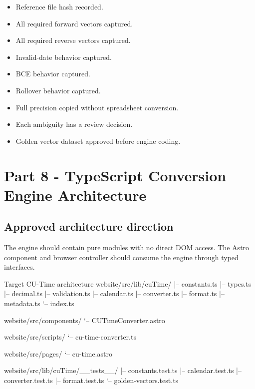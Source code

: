 \documentclass[11pt,letterpaper]{article}
\newcommand{\checkbox}{\(\square\)}
\begin{document}
\begin{itemize}
    \item[\checkbox] Reference file hash recorded.
    \item[\checkbox] All required forward vectors captured.
    \item[\checkbox] All required reverse vectors captured.
    \item[\checkbox] Invalid-date behavior captured.
    \item[\checkbox] BCE behavior captured.
    \item[\checkbox] Rollover behavior captured.
    \item[\checkbox] Full precision copied without spreadsheet conversion.
    \item[\checkbox] Each ambiguity has a review decision.
    \item[\checkbox] Golden vector dataset approved before engine coding.
\end{itemize}

\section{Part 8 - TypeScript Conversion Engine Architecture}

\subsection{Approved architecture direction}

The engine should contain pure modules with no direct DOM access. The Astro
component and browser controller should consume the engine through typed
interfaces.

\begin{codebox}{Target CU-Time architecture}
website/src/lib/cuTime/
|-- constants.ts
|-- types.ts
|-- decimal.ts
|-- validation.ts
|-- calendar.ts
|-- converter.ts
|-- format.ts
|-- metadata.ts
`-- index.ts

website/src/components/
`-- CUTimeConverter.astro

website/src/scripts/
`-- cu-time-converter.ts

website/src/pages/
`-- cu-time.astro

website/src/lib/cuTime/__tests__/
|-- constants.test.ts
|-- calendar.test.ts
|-- converter.test.ts
|-- format.test.ts
`-- golden-vectors.test.ts
\end{codebox}
\end{document}
